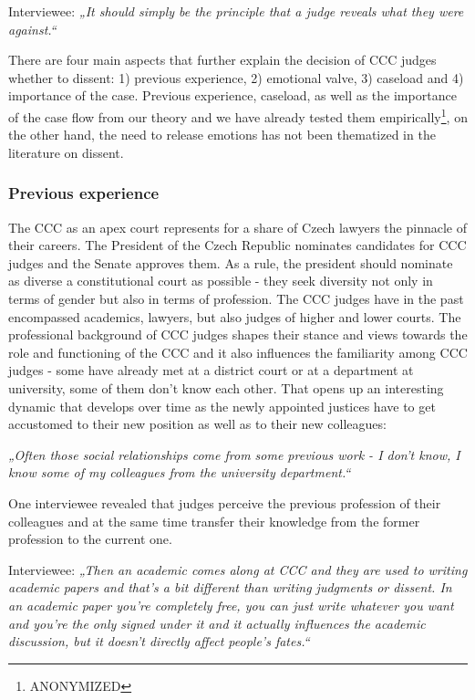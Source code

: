 \documentclass[
  11pt,
]{article}
\begin{document}
Interviewee: \emph{„It should simply be the principle that a judge reveals what they were against.``}

There are four main aspects that further explain the decision of CCC judges whether to dissent: 1) previous experience, 2) emotional valve, 3) caseload and 4) importance of the case. Previous experience, caseload, as well as the importance of the case flow from our theory and we have already tested them empirically\footnote{ANONYMIZED}, on the other hand, the need to release emotions has not been thematized in the literature on dissent.

\subsubsection{Previous experience}\label{previous-experience}

The CCC as an apex court represents for a share of Czech lawyers the pinnacle of their careers. The President of the Czech Republic nominates candidates for CCC judges and the Senate approves them. As a rule, the president should nominate as diverse a constitutional court as possible - they seek diversity not only in terms of gender but also in terms of profession. The CCC judges have in the past encompassed academics, lawyers, but also judges of higher and lower courts. The professional background of CCC judges shapes their stance and views towards the role and functioning of the CCC and it also influences the familiarity among CCC judges - some have already met at a district court or at a department at university, some of them don't know each other. That opens up an interesting dynamic that develops over time as the newly appointed justices have to get accustomed to their new position as well as to their new colleagues:

\emph{„Often those social relationships come from some previous work - I don't know, I know some of my colleagues from the university department.``}

One interviewee revealed that judges perceive the previous profession of their colleagues and at the same time transfer their knowledge from the former profession to the current one.

Interviewee: \emph{„Then an academic comes along at CCC and they are used to writing academic papers and that's a bit different than writing judgments or dissent. In an academic paper you're completely free, you can just write whatever you want and you're the only signed under it and it actually influences the academic discussion, but it doesn't directly affect people's fates.``}
\end{document}
